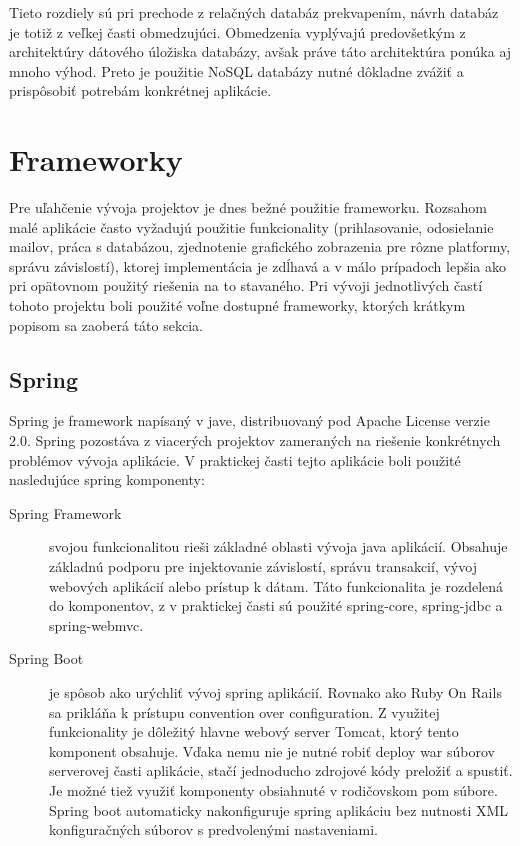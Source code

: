 	Tieto rozdiely sú pri prechode z relačných databáz prekvapením, návrh databáz je totiž z veľkej časti obmedzujúci. Obmedzenia vyplývajú predovšetkým z architektúry dátového úložiska databázy, avšak práve táto architektúra ponúka aj mnoho výhod. Preto je použitie NoSQL databázy nutné dôkladne zvážiť a prispôsobiť potrebám konkrétnej aplikácie.
	
\section{Frameworky}
	Pre uľahčenie vývoja projektov je dnes bežné použitie frameworku. Rozsahom malé aplikácie často vyžadujú použitie funkcionality (prihlasovanie, odosielanie mailov, práca s databázou, zjednotenie grafického zobrazenia pre rôzne platformy, správu závislostí), ktorej implementácia je zdĺhavá a v málo prípadoch lepšia ako pri opätovnom použitý riešenia na to stavaného. Pri vývoji jednotlivých častí tohoto projektu boli použité voľne dostupné frameworky, ktorých krátkym popisom sa zaoberá táto sekcia.

	\subsection{Spring}
	Spring je framework napísaný v jave, distribuovaný pod Apache License verzie 2.0. Spring pozostáva z viacerých projektov zameraných na riešenie konkrétnych problémov vývoja aplikácie. V praktickej časti tejto aplikácie boli použité nasledujúce spring komponenty:
	\begin{description}
		\item[Spring Framework] svojou funkcionalitou rieši základné oblasti vývoja java aplikácií. Obsahuje základnú podporu pre injektovanie závislostí, správu transakcií, vývoj webových aplikácií alebo prístup k dátam. Táto funkcionalita je rozdelená do komponentov, z v praktickej časti sú použité spring-core, spring-jdbc a spring-webmvc.
		
		\item[Spring Boot] je spôsob ako urýchliť vývoj spring aplikácií. Rovnako ako Ruby On Rails sa prikláňa k prístupu convention over configuration. Z využitej funkcionality je dôležitý hlavne webový server Tomcat, ktorý tento komponent obsahuje. Vďaka nemu nie je nutné robiť deploy war súborov serverovej časti aplikácie, stačí jednoducho zdrojové kódy preložiť a spustiť. Je možné tiež využiť komponenty obsiahnuté v rodičovskom pom súbore. Spring boot automaticky nakonfiguruje spring aplikáciu bez nutnosti XML konfiguračných súborov s predvolenými nastaveniami.
	\end{description}
		
